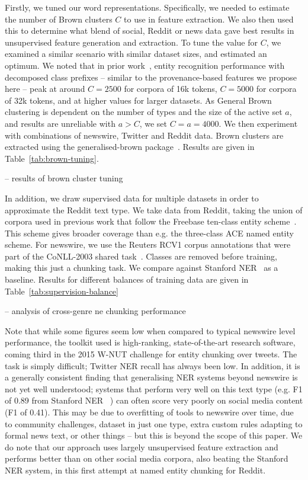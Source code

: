 \documentclass[journal,10pt,draftclsnofoot,onecolumn]{IEEEtran}
\begin{document}
Firstly, we tuned our word representations.
Specifically, we needed to estimate the number of Brown clusters $C$ to use in feature extraction.
We also then used this to determine what blend of social, Reddit or news data gave best results in unsupervised feature generation and extraction.
To tune the value for $C$, we examined a similar scenario with similar dataset sizes, and estimated an optimum.
We noted that in prior work~\cite{derczynski2015tune}, entity recognition performance with decomposed class prefixes -- similar to the provenance-based features we propose here -- peak at around $C=2500$ for corpora of 16k tokens, $C=5000$ for corpora of 32k tokens, and at higher values for larger datasets.
As General Brown clustering is dependent on the number of types and the size of the active set $a$, and results are unreliable with $a>C$, we set $C = a = 4000$.
We then experiment with combinations of newswire, Twitter and Reddit data.
Brown clusters are extracted using the generalised-brown package~\cite{sean_chester_2015_33758}.
Results are given in Table~\ref{tab:brown-tuning}.

-- results of brown cluster tuning


In addition, we draw supervised data for multiple datasets in order to approximate the Reddit text type.
We take data from Reddit, taking the union of corpora used in previous work that follow the Freebase ten-class entity scheme~\cite{ritter2011named,baldwin2015shared}.
This scheme gives broader coverage than e.g. the three-class ACE named entity scheme.
For newswire, we use the Reuters RCV1 corpus annotations that were part of the CoNLL-2003 shared task~\cite{tjong2003introduction}.
Classes are removed before training, making this just a chunking task.
We compare against Stanford NER~\cite{finkel2005incorporating} as a baseline.
Results for different balances of training data are given in Table~\ref{tab:supervision-balance}


-- analysis of cross-genre ne chunking performance


Note that while some figures seem low when compared to typical newswire level performance, the toolkit used is high-ranking, state-of-the-art research software, coming third in the 2015 W-NUT challenge for entity chunking over tweets.
The task is simply difficult; Twitter NER recall has always been low.
In addition, it is a generally consistent finding that generalising NER systems beyond newswire is not yet well understood; systems that perform very well on this text type (e.g. F1 of 0.89 from Stanford NER~\cite{derczynski2015analysis}%
) can often score very poorly on social media content (F1 of 0.41).
This may be due to overfitting of tools to newswire over time, due to community challenges, dataset in just one type, extra custom rules adapting to formal news text, or other things -- but this is beyond the scope of this paper.
We do note that our approach uses largely unsupervised feature extraction and performs better than on other social media corpora, also beating the Stanford NER system, in this first attempt at named entity chunking for Reddit.
\end{document}
